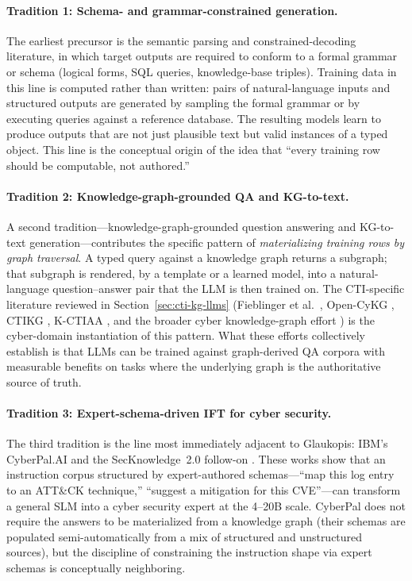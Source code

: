 \documentclass[unnumsec,webpdf,contemporary,large]{oup-authoring-template}
\theoremstyle{thmstyleone}
\theoremstyle{thmstyletwo}
\theoremstyle{thmstylethree}
\begin{document}
\paragraph{Tradition 1: Schema- and grammar-constrained generation.}
The earliest precursor is the semantic parsing and constrained-decoding literature, in which target outputs are required to conform to a formal grammar or schema (logical forms, SQL queries, knowledge-base triples). Training data in this line is computed rather than written: pairs of natural-language inputs and structured outputs are generated by sampling the formal grammar or by executing queries against a reference database. The resulting models learn to produce outputs that are not just plausible text but valid instances of a typed object. This line is the conceptual origin of the idea that ``every training row should be computable, not authored.''

\paragraph{Tradition 2: Knowledge-graph-grounded QA and KG-to-text.}
A second tradition---knowledge-graph-grounded question answering and KG-to-text generation---contributes the specific pattern of \emph{materializing training rows by graph traversal}. A typed query against a knowledge graph returns a subgraph; that subgraph is rendered, by a template or a learned model, into a natural-language question--answer pair that the LLM is then trained on. The CTI-specific literature reviewed in Section~\ref{sec:cti-kg-llms} (Fieblinger et al.\ \cite{fieblinger2024kg}, Open-CyKG \cite{wu2022opencykg}, CTIKG \cite{yu2024ctikg}, K-CTIAA \cite{zhao2024kctiaa}, and the broader cyber knowledge-graph effort \cite{zhang2023cyberkg}) is the cyber-domain instantiation of this pattern. What these efforts collectively establish is that LLMs can be trained against graph-derived QA corpora with measurable benefits on tasks where the underlying graph is the authoritative source of truth.

\paragraph{Tradition 3: Expert-schema-driven IFT for cyber security.}
The third tradition is the line most immediately adjacent to Glaukopis: IBM's CyberPal.AI \cite{levi2024cyberpal} and the SecKnowledge~2.0 follow-on \cite{levi2025toward}. These works show that an instruction corpus structured by expert-authored schemas---``map this log entry to an ATT\&CK technique,'' ``suggest a mitigation for this CVE''---can transform a general SLM into a cyber security expert at the 4--20B scale. CyberPal does not require the answers to be materialized from a knowledge graph (their schemas are populated semi-automatically from a mix of structured and unstructured sources), but the discipline of constraining the instruction shape via expert schemas is conceptually neighboring.
\end{document}
